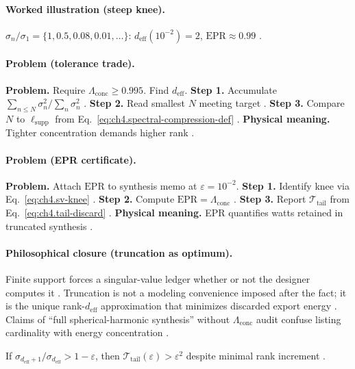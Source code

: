 \paragraph{Worked illustration (steep knee).}
\(\sigma_{n}/\sigma_{1}=\{1,0.5,0.08,0.01,\ldots\}\): \(d_{\mathrm{eff}}(10^{-2})=2\), \(\mathrm{EPR}\approx0.99\) \cite{harrington2001,devaney2004}.

\paragraph{Problem (tolerance trade).}
\textbf{Problem.} Require \(\Lambda_{\mathrm{conc}}\ge0.995\). Find \(d_{\mathrm{eff}}\).
\textbf{Step 1.} Accumulate \(\sum_{n\le N}\sigma_{n}^{2}/\sum_{n}\sigma_{n}^{2}\) \cite{harrington2001}.
\textbf{Step 2.} Read smallest \(N\) meeting target \cite{hansen1988}.
\textbf{Step 3.} Compare \(N\) to \(\ell_{\mathrm{supp}}\) from Eq.~\eqref{eq:ch4.spectral-compression-def} \cite{stratton1941}.
\textbf{Physical meaning.} Tighter concentration demands higher rank \cite{devaney2004}.

\paragraph{Problem (EPR certificate).}
\textbf{Problem.} Attach \(\mathrm{EPR}\) to synthesis memo at \(\varepsilon=10^{-2}\).
\textbf{Step 1.} Identify knee via Eq.~\eqref{eq:ch4.sv-knee} \cite{hansen1988}.
\textbf{Step 2.} Compute \(\mathrm{EPR}=\Lambda_{\mathrm{conc}}\) \cite{harrington2001}.
\textbf{Step 3.} Report \(\mathcal{T}_{\mathrm{tail}}\) from Eq.~\eqref{eq:ch4.tail-discard} \cite{stratton1941,devaney2004}.
\textbf{Physical meaning.} EPR quantifies watts retained in truncated synthesis \cite{hansen1988}.

\paragraph{Philosophical closure (truncation as optimum).}
Finite support forces a singular-value ledger whether or not the designer computes it \cite{stratton1941,hansen1988,harrington2001}. Truncation is
not a modeling convenience imposed after the fact; it is the unique rank-\(d_{\mathrm{eff}}\) approximation that minimizes discarded export energy
\cite{devaney2004}. Claims of ``full spherical-harmonic synthesis'' without \(\Lambda_{\mathrm{conc}}\) audit confuse listing cardinality with
energy concentration \cite{harrington2001}.

\begin{corollary}
\label{cor:ch4.tail-dominated}
If \(\sigma_{d_{\mathrm{eff}}+1}/\sigma_{d_{\mathrm{eff}}}>1-\varepsilon\), then \(\mathcal{T}_{\mathrm{tail}}(\varepsilon)>\varepsilon^{2}\) despite minimal rank increment
\cite{hansen1988,harrington2001,stratton1941,devaney2004}.
\end{corollary}
